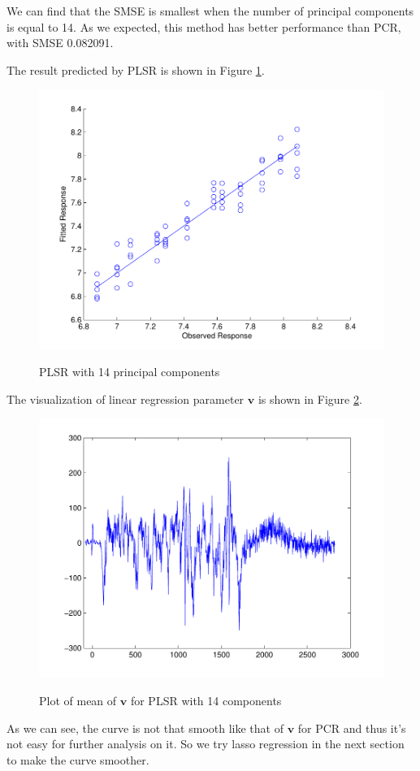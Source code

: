 \documentclass[a4paper]{article}
\newcommand{\bfv}{\mathbf{v}}
\begin{document}
\newpage
We can find that the SMSE is smallest when the number of principal components is equal to 14. As we expected, this method has better performance than PCR, with SMSE 0.082091. 

The result predicted by PLSR is shown in Figure \ref{pic6}.
\begin{figure}[h]
  \centering
  \includegraphics[width=.6\textwidth]{images/predict_PLSR.pdf}\\
  \caption{PLSR with 14 principal components}\label{pic6}
\end{figure}

The visualization of linear regression parameter $\bfv$ is shown in Figure \ref{pic7}.
\begin{figure}[h]
  \centering
  \includegraphics[width=.6\textwidth]{images/v_PLSR.pdf}\\
  \caption{Plot of mean of $\bfv$ for PLSR with 14 components}\label{pic7}
\end{figure}

As we can see, the curve is not that smooth like that of $\bfv$ for PCR and thus it's not easy for further analysis on it. So we try lasso regression in the next section to make the curve smoother. 
\end{document}
